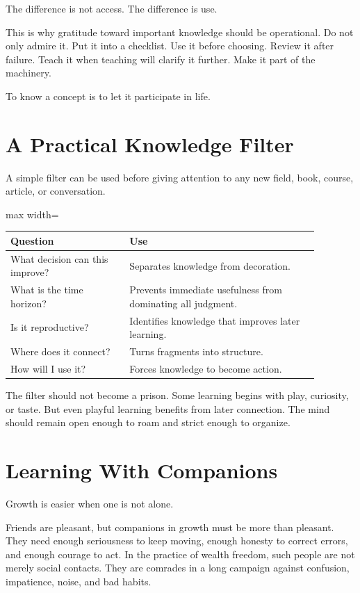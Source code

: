 The difference is not access. The difference is use.

This is why gratitude toward important knowledge should be operational. Do not only admire it. Put it into a checklist. Use it before choosing. Review it after failure. Teach it when teaching will clarify it further. Make it part of the machinery.

To know a concept is to let it participate in life.

\section*{A Practical Knowledge Filter}

A simple filter can be used before giving attention to any new field, book, course, article, or conversation.

\begin{center}
\begin{adjustbox}{max width=\linewidth}
\begin{tabular}{p{0.34\linewidth}p{0.54\linewidth}}
\hline
Question & Use \\
\hline
What decision can this improve? & Separates knowledge from decoration. \\
What is the time horizon? & Prevents immediate usefulness from dominating all judgment. \\
Is it reproductive? & Identifies knowledge that improves later learning. \\
Where does it connect? & Turns fragments into structure. \\
How will I use it? & Forces knowledge to become action. \\
\hline
\end{tabular}
\end{adjustbox}
\end{center}

The filter should not become a prison. Some learning begins with play, curiosity, or taste. But even playful learning benefits from later connection. The mind should remain open enough to roam and strict enough to organize.

\section*{Learning With Companions}

Growth is easier when one is not alone.

Friends are pleasant, but companions in growth must be more than pleasant. They need enough seriousness to keep moving, enough honesty to correct errors, and enough courage to act. In the practice of wealth freedom, such people are not merely social contacts. They are comrades in a long campaign against confusion, impatience, noise, and bad habits.

